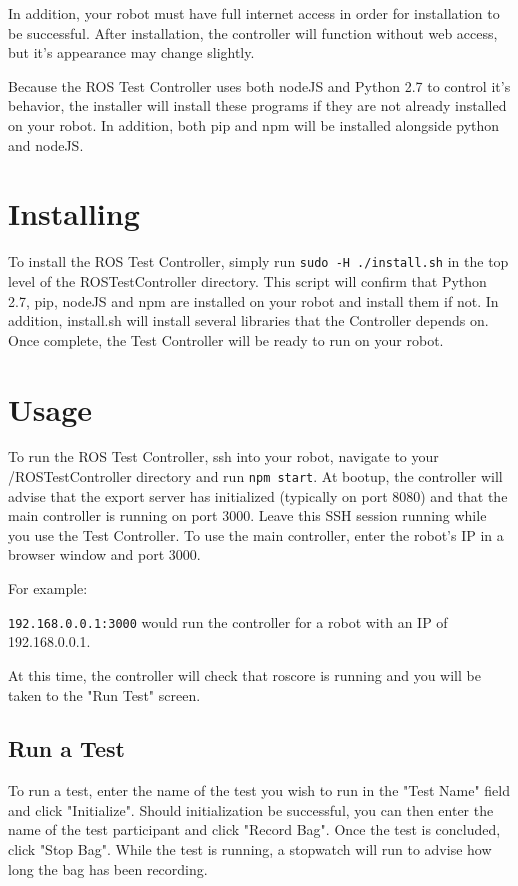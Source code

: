 \documentclass[onecolumn, draftclsnofoot,10pt, compsoc]{report}
\begin{document}
In addition, your robot must have full internet access in order for installation to be successful. After installation, the controller will function without web access, but it's appearance may change slightly.

Because the ROS Test Controller uses both nodeJS and Python 2.7 to control it's behavior, the installer will install these programs if they are not already installed on your robot. In addition, both pip and npm will be installed alongside python and nodeJS.
\section{Installing}

To install the ROS Test Controller, simply run \texttt{sudo -H ./install.sh} in the top level of the ROSTestController directory. This script will confirm that Python 2.7, pip, nodeJS and npm are installed on your robot and install them if not. In addition, install.sh will install several libraries that the Controller depends on. Once complete, the Test Controller will be ready to run on your robot.
\section{Usage}

To run the ROS Test Controller, ssh into your robot, navigate to your /ROSTestController directory and run \texttt{npm start}. At bootup, the controller will advise that the export server has initialized (typically on port 8080) and that the main controller is running on port 3000. Leave this SSH session running while you use the Test Controller. To use the main controller, enter the robot's IP in a browser window and port 3000.

For example:

\texttt{192.168.0.0.1:3000} would run the controller for a robot with an IP of 192.168.0.0.1.

At this time, the controller will check that roscore is running and you will be taken to the "Run Test" screen.
\subsection{Run a Test}

To run a test, enter the name of the test you wish to run in the "Test Name" field and click "Initialize". Should initialization be successful, you can then enter the name of the test participant and click "Record Bag". Once the test is concluded, click "Stop Bag". While the test is running, a stopwatch will run to advise how long the bag has been recording.
\end{document}
